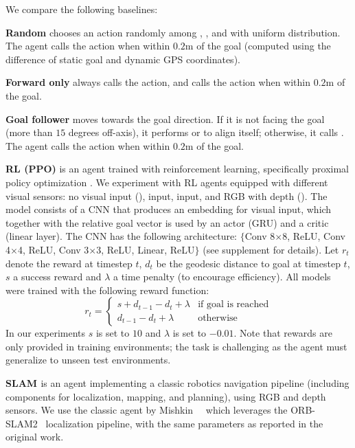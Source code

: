 We compare the following baselines:
\begin{compactitem}[\hspace{1pt}--]
\item \textbf{Random} chooses an action randomly among \turnleft, \turnright, and \forward with uniform distribution.
The agent calls the \callstop action when within $0.2\text{m}$ of the goal 
(computed using the difference of static goal and dynamic GPS
coordinates).

\item \textbf{Forward only} always calls the \forward action, and calls the \callstop action when within $0.2\text{m}$ of the goal.

\item \textbf{Goal follower} moves towards the goal direction. If it is not facing the goal (more than $15$ degrees off-axis), it performs \turnleft or \turnright to align itself; otherwise, it calls \forward.
The agent calls the \callstop action when within $0.2\text{m}$ of the goal.

\item \textbf{RL (PPO)} is an agent trained with reinforcement 
learning, 
specifically proximal policy optimization \cite{Schulman2017ProximalPO}. 
We experiment with RL agents equipped with different 
visual sensors:  %
no visual input (\blind), \rgb input, \depth input, and  RGB with depth (\rgbd). 
The model consists of a CNN that produces an embedding for visual input, which together with the relative goal vector 
is used by an actor (GRU) and a critic (linear layer).
The CNN has the following architecture: $\{$Conv 8$\times$8, ReLU, Conv 4$\times$4, ReLU, Conv  3$\times$3, ReLU, Linear, ReLU$\}$ (see supplement for details). 
Let $r_t$ denote the reward at timestep $t$, 
$d_{t}$ be the geodesic distance to goal at timestep $t$, 
$s$ a success reward and $\lambda$ a time penalty (to encourage 
efficiency). 
All models were trained with the following reward function:
$$
    r_t=\begin{cases}
s + d_{t - 1} - d_{t} + \lambda & \text{if goal is reached}
\\ d_{t - 1} - d_{t} + \lambda & \text{otherwise}
\end{cases}
$$
%
In our experiments $s$ is set to $10$ and $\lambda$ is set to $-0.01$.
Note that rewards are only provided in training environments; the task is challenging as the agent must generalize to unseen test environments.

\item \textbf{SLAM \cite{mishkin2019benchmarking}} 
is an agent implementing a classic robotics navigation pipeline 
(including components for localization, mapping, and planning), using RGB and depth sensors.
We use the classic agent by  Mishkin~\etal~\cite{mishkin2019benchmarking} which leverages the ORB-SLAM2~\cite{murORB2} localization pipeline, with the same parameters as reported in the original work.
\end{compactitem}

